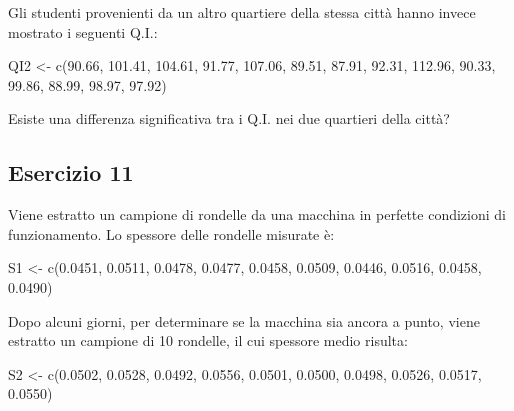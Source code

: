 \documentclass[a4paper,12pt,oneside]{book}
\newenvironment{Shaded}{\begin{snugshade}}{\end{snugshade}}
\newcommand{\FloatTok}[1]{#1}
\newcommand{\OtherTok}[1]{#1}
\newcommand{\FunctionTok}[1]{#1}
\newcommand{\NormalTok}[1]{#1}
\begin{document}
Gli studenti provenienti da un altro quartiere della stessa città hanno invece mostrato i seguenti Q.I.:

\begin{Shaded}
\begin{Highlighting}[]
\NormalTok{QI2 }\OtherTok{\textless{}{-}} \FunctionTok{c}\NormalTok{(}\FloatTok{90.66}\NormalTok{, }\FloatTok{101.41}\NormalTok{, }\FloatTok{104.61}\NormalTok{,  }\FloatTok{91.77}\NormalTok{, }\FloatTok{107.06}\NormalTok{,  }\FloatTok{89.51}\NormalTok{,  }\FloatTok{87.91}\NormalTok{,}
         \FloatTok{92.31}\NormalTok{, }\FloatTok{112.96}\NormalTok{,  }\FloatTok{90.33}\NormalTok{,  }\FloatTok{99.86}\NormalTok{,  }\FloatTok{88.99}\NormalTok{,  }\FloatTok{98.97}\NormalTok{,  }\FloatTok{97.92}\NormalTok{)}
\end{Highlighting}
\end{Shaded}

Esiste una differenza significativa tra i Q.I. nei due quartieri della città?

\hypertarget{esercizio-11}{%
\subsection{Esercizio 11}\label{esercizio-11}}

Viene estratto un campione di rondelle da una macchina in perfette condizioni di funzionamento. Lo spessore delle rondelle misurate è:

\begin{Shaded}
\begin{Highlighting}[]
\NormalTok{S1 }\OtherTok{\textless{}{-}} \FunctionTok{c}\NormalTok{(}\FloatTok{0.0451}\NormalTok{, }\FloatTok{0.0511}\NormalTok{, }\FloatTok{0.0478}\NormalTok{, }\FloatTok{0.0477}\NormalTok{, }\FloatTok{0.0458}\NormalTok{, }\FloatTok{0.0509}\NormalTok{, }\FloatTok{0.0446}\NormalTok{,}
        \FloatTok{0.0516}\NormalTok{, }\FloatTok{0.0458}\NormalTok{, }\FloatTok{0.0490}\NormalTok{)}
\end{Highlighting}
\end{Shaded}

Dopo alcuni giorni, per determinare se la macchina sia ancora a punto, viene estratto un campione di 10 rondelle, il cui spessore medio risulta:

\begin{Shaded}
\begin{Highlighting}[]
\NormalTok{S2 }\OtherTok{\textless{}{-}} \FunctionTok{c}\NormalTok{(}\FloatTok{0.0502}\NormalTok{, }\FloatTok{0.0528}\NormalTok{, }\FloatTok{0.0492}\NormalTok{, }\FloatTok{0.0556}\NormalTok{, }\FloatTok{0.0501}\NormalTok{, }\FloatTok{0.0500}\NormalTok{, }\FloatTok{0.0498}\NormalTok{,}
        \FloatTok{0.0526}\NormalTok{, }\FloatTok{0.0517}\NormalTok{, }\FloatTok{0.0550}\NormalTok{)}
\end{Highlighting}
\end{Shaded}
\end{document}
